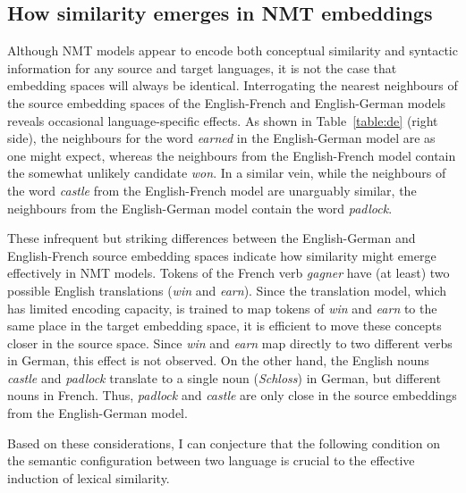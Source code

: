 \subsection{How similarity emerges in NMT embeddings}
\label{section:exp}

Although NMT models appear to encode both conceptual similarity and syntactic information for any source and target languages, it is not the case that embedding spaces will always be identical. Interrogating the nearest neighbours of the source embedding spaces of the English-French and English-German models reveals occasional language-specific effects. As shown in Table~\ref{table:de} (right side), the neighbours for the word \emph{earned} in the English-German model are as one might expect, whereas the neighbours from the English-French model contain the somewhat unlikely candidate \emph{won}. In a similar vein, while the neighbours of the word \emph{castle} from the English-French model are unarguably similar, the neighbours from the English-German model contain the word \emph{padlock}.
 
These infrequent but striking differences between the English-German and English-French source embedding spaces indicate how similarity might emerge effectively in NMT models. Tokens of the French verb \emph{gagner} have (at least) two possible English translations (\emph{win} and \emph{earn}). Since the translation model, which has limited encoding capacity, is trained to map tokens of \emph{win} and \emph{earn} to the same place in the target embedding space, it is efficient to move these concepts closer in the source space. Since \emph{win} and \emph{earn} map directly to two different verbs in German, this effect is not observed. On the other hand, the English nouns \emph{castle} and \emph{padlock} translate to a single noun (\emph{Schloss}) in German, but different nouns in French. Thus, \emph{padlock} and \emph{castle} are only close in the source embeddings from the English-German model. 

Based on these considerations, I can conjecture that the following condition on the semantic configuration between two language is crucial to the effective induction of lexical similarity. 


